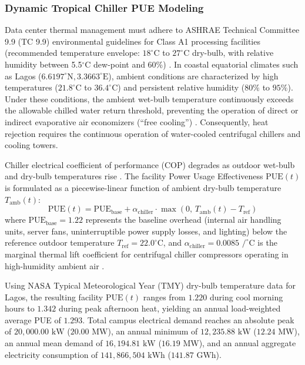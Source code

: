 \documentclass[11pt,a4paper]{article}
\begin{document}
\subsubsection{Dynamic Tropical Chiller PUE Modeling}
Data center thermal management must adhere to ASHRAE Technical Committee 9.9 (TC 9.9) environmental guidelines for Class A1 processing facilities (recommended temperature envelope: $18^\circ\text{C}$ to $27^\circ\text{C}$ dry-bulb, with relative humidity between 5.5$^\circ\text{C}$ dew-point and 60\%) \cite{ASHRAE2021}. In coastal equatorial climates such as Lagos ($6.6197^\circ\text{N}, 3.3663^\circ\text{E}$), ambient conditions are characterized by high temperatures ($21.8^\circ\text{C}$ to $36.4^\circ\text{C}$) and persistent relative humidity ($80\%$ to $95\%$). Under these conditions, the ambient wet-bulb temperature continuously exceeds the allowable chilled water return threshold, preventing the operation of direct or indirect evaporative air economizers (``free cooling'') \cite{Yu2021}. Consequently, heat rejection requires the continuous operation of water-cooled centrifugal chillers and cooling towers.

Chiller electrical coefficient of performance (COP) degrades as outdoor wet-bulb and dry-bulb temperatures rise \cite{Yu2021}. The facility Power Usage Effectiveness $\text{PUE}(t)$ is formulated as a piecewise-linear function of ambient dry-bulb temperature $T_{\text{amb}}(t)$:
\begin{equation}
    \text{PUE}(t) = \text{PUE}_{\text{base}} + \alpha_{\text{chiller}} \cdot \max\left(0, \, T_{\text{amb}}(t) - T_{\text{ref}}\right)
    \label{eq:pue}
\end{equation}
where $\text{PUE}_{\text{base}} = 1.22$ represents the baseline overhead (internal air handling units, server fans, uninterruptible power supply losses, and lighting) below the reference outdoor temperature $T_{\text{ref}} = 22.0^\circ\text{C}$, and $\alpha_{\text{chiller}} = 0.0085\text{ /}^\circ\text{C}$ is the marginal thermal lift coefficient for centrifugal chiller compressors operating in high-humidity ambient air \cite{Yu2021, ASHRAE2021}.

Using NASA Typical Meteorological Year (TMY) dry-bulb temperature data for Lagos, the resulting facility $\text{PUE}(t)$ ranges from $1.220$ during cool morning hours to $1.342$ during peak afternoon heat, yielding an annual load-weighted average PUE of $1.293$. Total campus electrical demand reaches an absolute peak of $20,000.00\text{ kW}$ ($20.00\text{ MW}$), an annual minimum of $12,235.88\text{ kW}$ ($12.24\text{ MW}$), an annual mean demand of $16,194.81\text{ kW}$ ($16.19\text{ MW}$), and an annual aggregate electricity consumption of $141,866,504\text{ kWh}$ ($141.87\text{ GWh}$).
\end{document}
